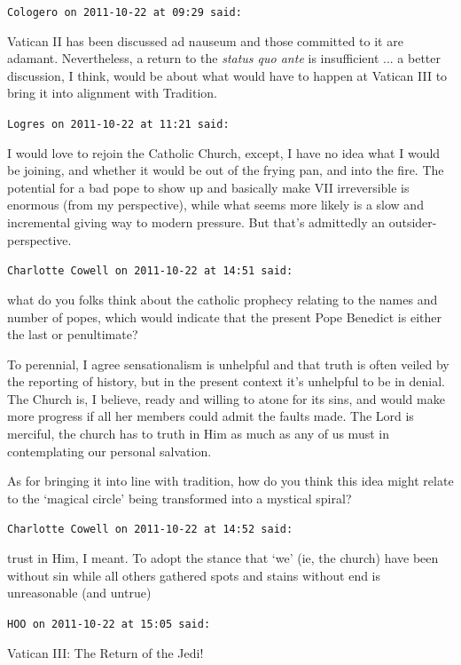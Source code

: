 \begin{footnotesize}
\begin{sffamily}
\hfill

\texttt{Cologero on 2011-10-22 at 09:29 said:}

Vatican II has been discussed ad nauseum and those committed to it are adamant. Nevertheless, a return to the \emph{status quo ante} is insufficient ... a better discussion, I think, would be about what would have to happen at Vatican III to bring it into alignment with Tradition.

\hfill

\texttt{Logres on 2011-10-22 at 11:21 said:}

I would love to rejoin the Catholic Church, except, I have no idea what I would be joining, and whether it would be out of the frying pan, and into the fire. The potential for a bad pope to show up and basically make VII irreversible is enormous (from my perspective), while what seems more likely is a slow and incremental giving way to modern pressure. But that's admittedly an outsider-perspective.

\hfill

\texttt{Charlotte Cowell on 2011-10-22 at 14:51 said:}

what do you folks think about the catholic prophecy relating to the names and number of popes, which would indicate that the present Pope Benedict is either the last or penultimate?

To perennial, I agree sensationalism is unhelpful and that truth is often veiled by the reporting of history, but in the present context it's unhelpful to be in denial. The Church is, I believe, ready and willing to atone for its sins, and would make more progress if all her members could admit the faults made. The Lord is merciful, the church has to truth in Him as much as any of us must in contemplating our personal salvation.

As for bringing it into line with tradition, how do you think this idea might relate to the `magical circle' being transformed into a mystical spiral?

\hfill

\texttt{Charlotte Cowell on 2011-10-22 at 14:52 said:}

trust in Him, I meant. To adopt the stance that `we' (ie, the church) have been without sin while all others gathered spots and stains without end is unreasonable (and untrue)

\hfill

\texttt{HOO on 2011-10-22 at 15:05 said:}

Vatican III: The Return of the Jedi!


\end{sffamily}
\end{footnotesize}
